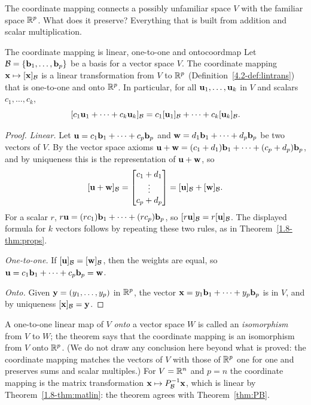 \documentclass[11pt]{article}
\begin{document}
The coordinate mapping connects a possibly unfamiliar space $V$ with the familiar space $\mathbb{R}^p$. What does it preserve? Everything that is built from addition and scalar multiplication.

\begin{thm}{The coordinate mapping is linear, one-to-one and onto}{coordmap}
Let $\mathcal{B}=\{\mathbf{b}_1,\dots,\mathbf{b}_p\}$ be a basis for a vector space $V$. The coordinate mapping $\mathbf{x}\mapsto[\mathbf{x}]_{\mathcal{B}}$ is a linear transformation from $V$ to $\mathbb{R}^p$ (Definition~\ref{4.2-def:lintrans}) that is one-to-one and onto $\mathbb{R}^p$. In particular, for all $\mathbf{u}_1,\dots,\mathbf{u}_k$ in $V$ and scalars $c_1,\dots,c_k$,
\[
[c_1\mathbf{u}_1+\cdots+c_k\mathbf{u}_k]_{\mathcal{B}}=c_1[\mathbf{u}_1]_{\mathcal{B}}+\cdots+c_k[\mathbf{u}_k]_{\mathcal{B}}.
\]
\end{thm}

\begin{proof}
\emph{Linear.} Let $\mathbf{u}=c_1\mathbf{b}_1+\cdots+c_p\mathbf{b}_p$ and $\mathbf{w}=d_1\mathbf{b}_1+\cdots+d_p\mathbf{b}_p$ be two vectors of $V$. By the vector space axioms $\mathbf{u}+\mathbf{w}=(c_1+d_1)\mathbf{b}_1+\cdots+(c_p+d_p)\mathbf{b}_p$, and by uniqueness this is the representation of $\mathbf{u}+\mathbf{w}$, so
\[
[\mathbf{u}+\mathbf{w}]_{\mathcal{B}}=\begin{bmatrix}c_1+d_1\\\vdots\\c_p+d_p\end{bmatrix}=[\mathbf{u}]_{\mathcal{B}}+[\mathbf{w}]_{\mathcal{B}}.
\]
For a scalar $r$, $r\mathbf{u}=(rc_1)\mathbf{b}_1+\cdots+(rc_p)\mathbf{b}_p$, so $[r\mathbf{u}]_{\mathcal{B}}=r[\mathbf{u}]_{\mathcal{B}}$. The displayed formula for $k$ vectors follows by repeating these two rules, as in Theorem~\ref{1.8-thm:props}.

\emph{One-to-one.} If $[\mathbf{u}]_{\mathcal{B}}=[\mathbf{w}]_{\mathcal{B}}$, then the weights are equal, so $\mathbf{u}=c_1\mathbf{b}_1+\cdots+c_p\mathbf{b}_p=\mathbf{w}$.

\emph{Onto.} Given $\mathbf{y}=(y_1,\dots,y_p)$ in $\mathbb{R}^p$, the vector $\mathbf{x}=y_1\mathbf{b}_1+\cdots+y_p\mathbf{b}_p$ is in $V$, and by uniqueness $[\mathbf{x}]_{\mathcal{B}}=\mathbf{y}$.
\end{proof}

A one-to-one linear map of $V$ \emph{onto} a vector space $W$ is called an \emph{isomorphism} from $V$ to $W$; the theorem says that the coordinate mapping is an isomorphism from $V$ onto $\mathbb{R}^p$. (We do not draw any conclusion here beyond what is proved: the coordinate mapping matches the vectors of $V$ with those of $\mathbb{R}^p$ one for one and preserves sums and scalar multiples.) For $V=\mathbb{R}^n$ and $p=n$ the coordinate mapping is the matrix transformation $\mathbf{x}\mapsto P_{\mathcal{B}}^{-1}\mathbf{x}$, which is linear by Theorem~\ref{1.8-thm:matlin}: the theorem agrees with Theorem~\ref{thm:PB}.
\end{document}
